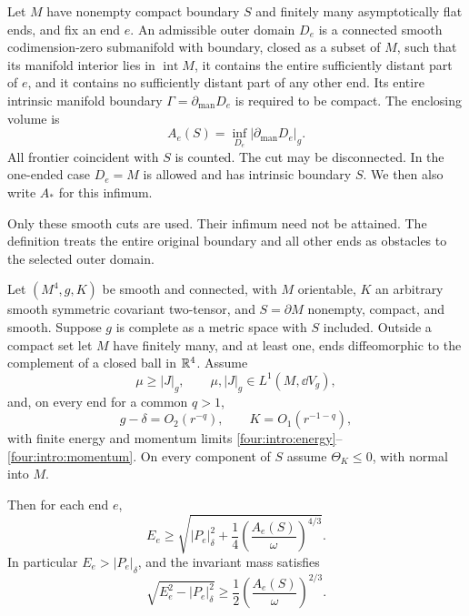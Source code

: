 \begin{definition}\label{four:def:cuts}
Let \(M\) have nonempty compact boundary \(S\) and finitely many
asymptotically flat ends, and fix an end \(e\).
An admissible outer domain \(D_e\) is a connected smooth
codimension-zero submanifold with boundary, closed as a subset of \(M\),
such that its manifold interior lies in \(\operatorname{int}M\),
it contains the entire sufficiently distant part of \(e\), and
it contains no sufficiently distant part of any other end.
Its entire intrinsic manifold boundary
\(\Gamma=\partial_{\mathrm{man}}D_e\) is required to be compact.
The enclosing volume is
\[
 A_e(S)=\inf_{D_e}|\partial_{\mathrm{man}}D_e|_g.
\]
All frontier coincident with \(S\) is counted. The cut may be
disconnected. In the one-ended case \(D_e=M\) is allowed and has
intrinsic boundary \(S\). We then also write \(A_*\) for this infimum.
\end{definition}

Only these smooth cuts are used. Their infimum need not be attained.
The definition treats the entire original boundary and all other ends
as obstacles to the selected outer domain.

\begin{theorem}\label{four:thm:main}
Let \((M^4,g,K)\) be smooth and
connected, with \(M\) orientable, \(K\) an arbitrary smooth symmetric
covariant two-tensor, and \(S=\partial M\) nonempty, compact, and smooth.
Suppose \(g\) is complete as a metric space with \(S\) included.
Outside a compact set let \(M\) have finitely many, and at least one,
ends diffeomorphic to the complement of a closed ball in \(\mathbb R^4\).
Assume
\[
 \mu\ge|J|_g,\qquad \mu,|J|_g\in L^1(M,\dd V_g),
\]
and, on every end for a common \(q>1\),
\[
 g-\delta=O_2(r^{-q}),\qquad K=O_1(r^{-1-q}),
\]
with finite energy and momentum limits
\eqref{four:intro:energy}--\eqref{four:intro:momentum}.
On every component of \(S\) assume \(\Theta_K\le0\), with normal into \(M\).

Then for each end \(e\),
\begin{equation}\label{four:intro:main}
 E_e\ge
 \sqrt{|P_e|_\delta^2+
       \frac14\left(\frac{A_e(S)}{\omega}\right)^{4/3}}.
\end{equation}
In particular \(E_e>|P_e|_\delta\), and the invariant mass satisfies
\begin{equation}\label{four:intro:mass}
 \sqrt{E_e^2-|P_e|_\delta^2}
   \ge\frac12\left(\frac{A_e(S)}{\omega}\right)^{2/3}.
\end{equation}
\end{theorem}

